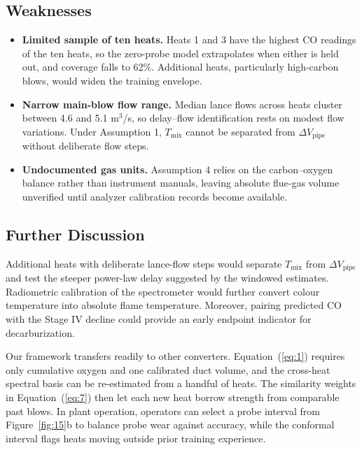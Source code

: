 \subsection{Weaknesses}\label{sec:9.2}

\begin{itemize}
\item \textbf{Limited sample of ten heats.} Heats 1 and 3 have the highest CO readings of the ten heats, so the zero-probe model extrapolates when either is held out, and coverage falls to 62\%. Additional heats, particularly high-carbon blows, would widen the training envelope.
\item \textbf{Narrow main-blow flow range.} Median lance flows across heats cluster between 4.6 and 5.1 m\ensuremath{^{3}}/s, so delay–flow identification rests on modest flow variations. Under Assumption 1, $T_{\mathrm{mix}}$ cannot be separated from $\Delta V_{\mathrm{pipe}}$ without deliberate flow steps.
\item \textbf{Undocumented gas units.} Assumption 4 relies on the carbon–oxygen balance rather than instrument manuals, leaving absolute flue-gas volume unverified until analyzer calibration records become available.
\end{itemize}

\subsection{Further Discussion}\label{sec:9.3}

Additional heats with deliberate lance-flow steps would separate $T_{\mathrm{mix}}$ from $\Delta V_{\mathrm{pipe}}$ and test the steeper power-law delay suggested by the windowed estimates. Radiometric calibration of the spectrometer would further convert colour temperature into absolute flame temperature. Moreover, pairing predicted CO with the Stage IV decline could provide an early endpoint indicator for decarburization.

Our framework transfers readily to other converters. Equation~(\ref{eq:1}) requires only cumulative oxygen and one calibrated duct volume, and the cross-heat spectral basis can be re-estimated from a handful of heats. The similarity weights in Equation~(\ref{eq:7}) then let each new heat borrow strength from comparable past blows. In plant operation, operators can select a probe interval from Figure~\ref{fig:15}b to balance probe wear against accuracy, while the conformal interval flags heats moving outside prior training experience.


